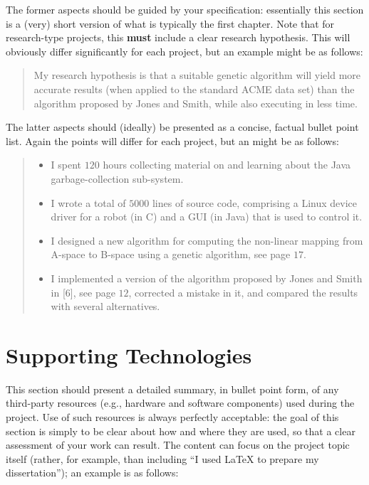 \documentclass[ %
                    author={Lucas O'Dowd-Jones},
                supervisor={Dr. Alex Kavvos},
                    degree={MEng},
                     title={Variations on Normalisation by Evaluation in Haskell},
                  subtitle={},
                      type={programming languages},
                      year={2021} ]{dissertation}
\begin{document}
The former aspects should be guided by your specification: essentially 
this section is a (very) short version of what is typically the first 
chapter.  Note that for research-type projects, this {\bf must} include 
a clear research hypothesis.  This will obviously differ significantly
for each project, but an example might be as follows:

\begin{quote}
My research hypothesis is that a suitable genetic algorithm will yield
more accurate results (when applied to the standard ACME data set) than 
the algorithm proposed by Jones and Smith, while also executing in less
time.
\end{quote}

\noindent
The latter aspects should (ideally) be presented as a concise, factual 
bullet point list.  Again the points will differ for each project, but 
an might be as follows:

\begin{quote}
\noindent
\begin{itemize}
\item I spent $120$ hours collecting material on and learning about the 
      Java garbage-collection sub-system. 
\item I wrote a total of $5000$ lines of source code, comprising a Linux 
      device driver for a robot (in C) and a GUI (in Java) that is 
      used to control it.
\item I designed a new algorithm for computing the non-linear mapping 
      from A-space to B-space using a genetic algorithm, see page $17$.
\item I implemented a version of the algorithm proposed by Jones and 
      Smith in [6], see page $12$, corrected a mistake in it, and 
      compared the results with several alternatives.
\end{itemize}
\end{quote}


\chapter*{Supporting Technologies}


\noindent
This section should present a detailed summary, in bullet point form, 
of any third-party resources (e.g., hardware and software components) 
used during the project.  Use of such resources is always perfectly 
acceptable: the goal of this section is simply to be clear about how
and where they are used, so that a clear assessment of your work can
result.  The content can focus on the project topic itself (rather,
for example, than including ``I used \mbox{\LaTeX} to prepare my 
dissertation''); an example is as follows:
\end{document}
